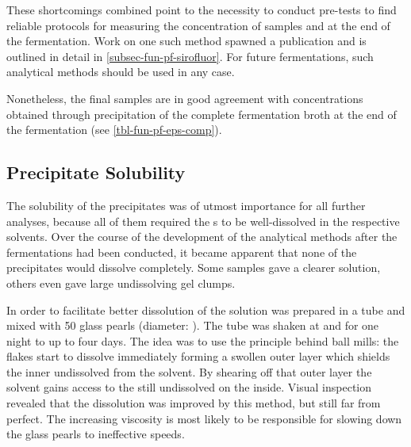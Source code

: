 These shortcomings combined point to the necessity to conduct pre-tests to find reliable protocols for measuring the \eps{} concentration of samples and at the end of the fermentation. Work on one such method spawned a publication \cite{Koenig2017} and is outlined in detail in \vref{subsec-fun-pf-sirofluor}. For future fermentations, such analytical methods should be used in any case.

Nonetheless, the final samples are in good agreement with concentrations obtained through precipitation of the complete fermentation broth at the end of the fermentation (see \vref{tbl-fun-pf-eps-comp}). 

\subsection{Precipitate Solubility\label{subsec-fun-pf-pre-sol}}
The solubility of the precipitates was of utmost importance for all further analyses, because all of them required the \eps{}s to be well-dissolved in the respective solvents. Over the course of the development of the analytical methods after the fermentations had been conducted, it became apparent that none of the precipitates would dissolve completely. Some samples gave a clearer solution, others even gave large undissolving gel clumps.

In order to facilitate better dissolution  of the solution was prepared in a  tube and mixed with 50 glass pearls (diameter: ). The tube was shaken at  and  for one night to up to four days. The idea was to use the principle behind ball mills: the \eps{} flakes start to dissolve immediately forming a swollen outer layer which shields the inner undissolved \eps{} from the solvent. By shearing off that outer layer the solvent gains access to the still undissolved \eps{} on the inside. Visual inspection revealed that the dissolution was improved by this method, but still far from perfect. The increasing viscosity is most likely to be responsible for slowing down the glass pearls to ineffective speeds.

